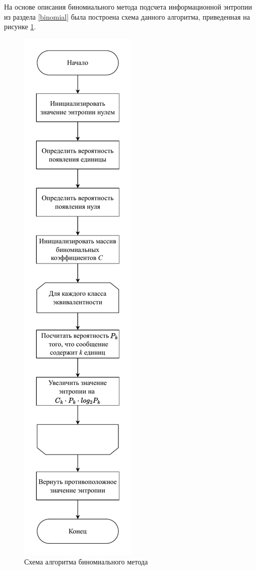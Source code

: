 На основе описания биномиального метода подсчета информационной энтропии из раздела \ref{binomial} была построена схема данного алгоритма, приведенная на рисунке \ref{img:get-binomial-entropy}.

\begin{figure}[H]
	\begin{center}
		\includegraphics[scale=0.7]{inc/img/get-binomial-entropy.pdf}
	\end{center}
	\captionsetup{justification=centering}
	\caption{Схема алгоритма биномиального метода}
	\label{img:get-binomial-entropy}
\end{figure}


